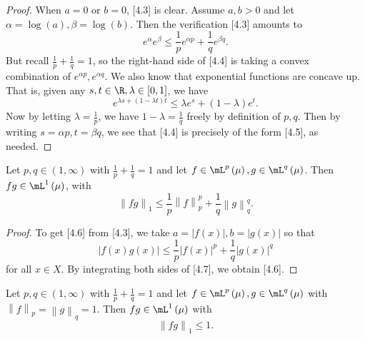 \documentclass[pmath450]{subfiles}
\begin{document}
    \begin{proof}
        When $a=0$ or $b=0$, [4.3] is clear. Assume $a,b>0$ and let $\alpha=\log\left( a \right),\beta=\log\left( b \right)$. Then the verification [4.3] amounts to
        \begin{equation}
            e^{\alpha}e^{\beta} \leq \frac{1}{p} e^{\alpha p} + \frac{1}{q} e^{\beta q}.
        \end{equation}
        But recall $\frac{1}{p}+\frac{1}{q}=1$, so the right-hand side of [4.4] is taking a convex combination of $e^{\alpha p}, e^{\alpha q}$. We also know that exponential functions are concave up. That is, given any $s,t\in\R, \lambda\in\left[ 0,1 \right]$, we have
        \begin{equation}
            e^{\lambda s+\left( 1-\lambda t \right)t} \leq \lambda e^{s} + \left( 1-\lambda \right)e^{t}.
        \end{equation}
        Now by letting $\lambda=\frac{1}{p}$, we have $1-\lambda=\frac{1}{q}$ freely by definition of $p,q$. Then by writing $s=\alpha p, t=\beta q$, we see that [4.4] is precisely of the form [4.5], as needed.
    \end{proof}
    
    \begin{lemma}{}
        Let $p,q\in\left( 1,\infty \right)$ with $\frac{1}{p}+\frac{1}{q}=1$ and let $f\in\mL^p\left( \mu \right),g\in\mL^q\left( \mu \right)$. Then $fg\in\lone\left( \mu \right)$, with
        \begin{equation}
            \left\lVert fg \right\rVert_{1} \leq \frac{1}{p}\left\lVert f\right\rVert^p_p + \frac{1}{q}\left\lVert g\right\rVert^q_q.
        \end{equation}
    \end{lemma}
    
    \begin{proof}
        To get [4.6] from [4.3], we take $a=\left| f\left( x \right) \right|,b=\left| g\left( x \right) \right|$ so that
        \begin{equation}
            \left| f\left( x \right)g\left( x \right) \right|\leq \frac{1}{p}\left| f\left( x \right) \right|^p+\frac{1}{q}\left| g\left( x \right) \right|^q
        \end{equation}
        for all $x\in X$. By integrating both sides of [4.7], we obtain [4.6].
    \end{proof}
    
    \clearpage

    \begin{lemma}{}
        Let $p,q\in\left( 1,\infty \right)$ with $\frac{1}{p}+\frac{1}{q}=1$ and let $f\in\mL^p\left( \mu \right),g\in\mL^q\left( \mu \right)$ with $\left\lVert f\right\rVert_p = \left\lVert g\right\rVert_q = 1$. Then $fg\in\lone\left( \mu \right)$ with
        \begin{equation}
            \left\lVert fg \right\rVert_{1}\leq 1.
        \end{equation}
    \end{lemma}
    
\end{document}
